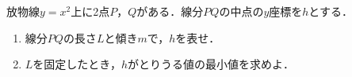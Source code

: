 \documentclass[../../main.tex]{subfiles}
\begin{document}
放物線$y=x^2$上に2点$P$，$Q$がある．線分$PQ$の中点の$y$座標を$h$とする．
\begin{enumerate}
  \item 線分$PQ$の長さ$L$と傾き$m$で，$h$を表せ．
  \item $L$を固定したとき，$h$がとりうる値の最小値を求めよ．
\end{enumerate}
\end{document}
